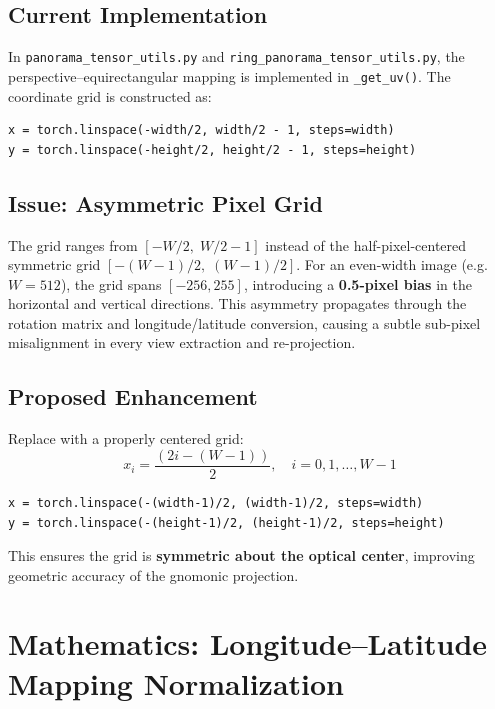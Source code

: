 \documentclass[11pt,a4paper]{article}
\newcommand{\file}[1]{\texttt{#1}}
\newcommand{\fn}[1]{\texttt{#1}}
\begin{document}
\subsection{Current Implementation}

In \file{panorama\_tensor\_utils.py} and \file{ring\_panorama\_tensor\_utils.py}, the perspective--equirectangular mapping is implemented in \fn{\_get\_uv()}.
The coordinate grid is constructed as:

\begin{lstlisting}
x = torch.linspace(-width/2, width/2 - 1, steps=width)
y = torch.linspace(-height/2, height/2 - 1, steps=height)
\end{lstlisting}

\subsection{Issue: Asymmetric Pixel Grid}

The grid ranges from $[-W/2, \; W/2-1]$ instead of the half-pixel-centered symmetric grid $[-(W-1)/2, \; (W-1)/2]$.
For an even-width image (e.g.\ $W=512$), the grid spans $[-256, 255]$, introducing a \textbf{0.5-pixel bias} in the horizontal and vertical directions.
This asymmetry propagates through the rotation matrix and longitude/latitude conversion, causing a subtle sub-pixel misalignment in every view extraction and re-projection.

\subsection{Proposed Enhancement}

Replace with a properly centered grid:
\begin{equation}
    x_i = \frac{(2i - (W-1))}{2}, \quad i = 0, 1, \ldots, W-1
\end{equation}
\begin{lstlisting}
x = torch.linspace(-(width-1)/2, (width-1)/2, steps=width)
y = torch.linspace(-(height-1)/2, (height-1)/2, steps=height)
\end{lstlisting}

This ensures the grid is \textbf{symmetric about the optical center}, improving geometric accuracy of the gnomonic projection.

\section{Mathematics: Longitude--Latitude Mapping Normalization}
\end{document}
